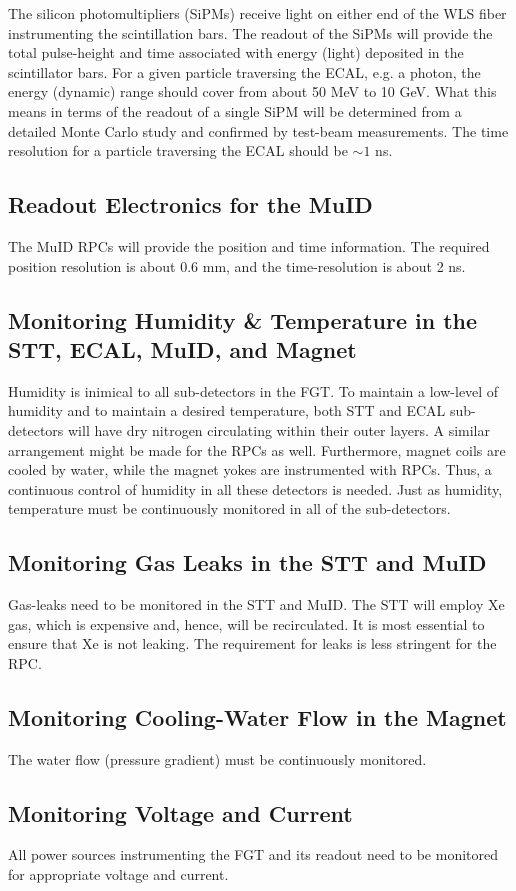 The silicon photomultipliers (SiPMs) receive light on either end of
the WLS fiber 
instrumenting the scintillation bars. The readout of the SiPMs will provide the total 
pulse-height and time associated with energy (light) deposited in the scintillator bars. 
For a given particle traversing the ECAL, e.g. a photon, the energy (dynamic) range 
should cover from about 50 MeV to 10 GeV. What this means in terms of
the readout of a single SiPM will be determined from a detailed Monte Carlo study 
and confirmed by test-beam measurements.
The time resolution for a particle traversing the ECAL should be $\sim 1$ ns.

\subsection{Readout Electronics for the MuID}

The MuID RPCs will provide the position and time information. The required position 
resolution is about 0.6 mm, and the time-resolution is about 2 ns.

\subsection{Monitoring Humidity \& Temperature in the STT, ECAL, MuID, and Magnet}

Humidity is inimical to all sub-detectors in the FGT. To maintain a low-level of 
humidity and to maintain a desired temperature, both STT and ECAL sub-detectors
will have dry nitrogen circulating within their outer layers. A similar arrangement 
might be made for the RPCs as well. Furthermore, magnet coils are cooled by water, 
while the magnet yokes are instrumented with RPCs. Thus, a continuous control of 
humidity in all these detectors is needed.
Just as humidity, temperature must be continuously monitored in all of the sub-detectors.

\subsection{Monitoring Gas Leaks in the STT and MuID}

Gas-leaks need to be monitored in the STT and MuID.
The STT will employ Xe gas, which is expensive and, hence, will be recirculated. It is 
most essential to ensure that Xe is not leaking. The requirement for leaks is less 
stringent for the RPC. 

\subsection{Monitoring Cooling-Water Flow in the Magnet}

The water flow (pressure gradient) must be continuously monitored.

\subsection{Monitoring Voltage and Current}

All power sources instrumenting the FGT and its readout need to be monitored for 
appropriate voltage and current.

